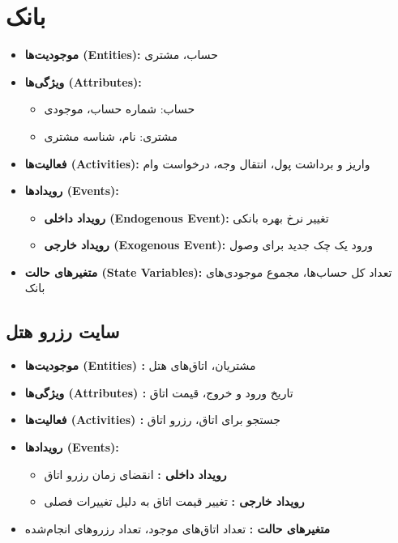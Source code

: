\section*{بانک}
\begin{itemize}
	\item \textbf{موجودیت‌ها (Entities):} حساب، مشتری
	\item \textbf{ویژگی‌ها (Attributes):} 
	\begin{itemize}
		\item حساب: شماره حساب، موجودی
		\item مشتری: نام، شناسه مشتری
	\end{itemize}
	\item \textbf{فعالیت‌ها (Activities):} واریز و برداشت پول، انتقال وجه، درخواست وام
	\item \textbf{رویدادها (Events):}
	\begin{itemize}
		\item \textbf{رویداد داخلی (Endogenous Event):} تغییر نرخ بهره بانکی
		\item \textbf{رویداد خارجی (Exogenous Event):} ورود یک چک جدید برای وصول
	\end{itemize}
	\item \textbf{متغیرهای حالت (State Variables):} تعداد کل حساب‌ها، مجموع موجودی‌های بانک
\end{itemize}

\subsection*{سایت رزرو هتل}
\begin{itemize}
	\item \textbf{موجودیت‌ها (Entities) :} مشتریان، اتاق‌های هتل
	\item \textbf{ویژگی‌ها (Attributes) :} تاریخ ورود و خروج، قیمت اتاق
	\item \textbf{فعالیت‌ها (Activities) :} جستجو برای اتاق، رزرو اتاق
	\item \textbf{رویدادها (Events):}
	\begin{itemize}
		\item \textbf{رویداد داخلی  :} انقضای زمان رزرو اتاق
		\item \textbf{رویداد خارجی  :} تغییر قیمت اتاق به دلیل تغییرات فصلی
	\end{itemize}
	\item \textbf{متغیرهای حالت  :} تعداد اتاق‌های موجود، تعداد رزروهای انجام‌شده
\end{itemize}

